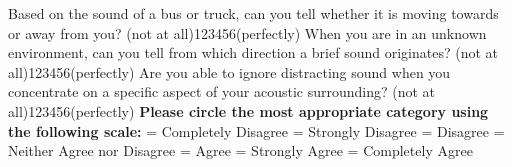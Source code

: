 \documentclass[12pt, a4paper]{article}
\begin{document}
\newline  Based on the sound of a bus or truck, can you tell whether it is moving towards or away from you?
\newline (not at all)\hspace{12pt}1\hspace{12pt}2\hspace{12pt}3\hspace{12pt}4\hspace{12pt}5\hspace{12pt}6\hspace{12pt}(perfectly)
\vspace{8pt}
\newline  When you are in an unknown environment, can you tell from which direction a brief sound originates?
\newline (not at all)\hspace{12pt}1\hspace{12pt}2\hspace{12pt}3\hspace{12pt}4\hspace{12pt}5\hspace{12pt}6\hspace{12pt}(perfectly)
\vspace{8pt}
\newline  Are you able to ignore distracting sound when you concentrate on a specific aspect of your acoustic surrounding?
\newline (not at all)\hspace{12pt}1\hspace{12pt}2\hspace{12pt}3\hspace{12pt}4\hspace{12pt}5\hspace{12pt}6\hspace{12pt}(perfectly)
\vspace{8pt}
\newline\textbf{Please circle the most appropriate category using the following scale:}
 = Completely Disagree
 = Strongly Disagree
 = Disagree
 = Neither Agree nor Disagree
 = Agree
 = Strongly Agree
 = Completely Agree
\end{document}
